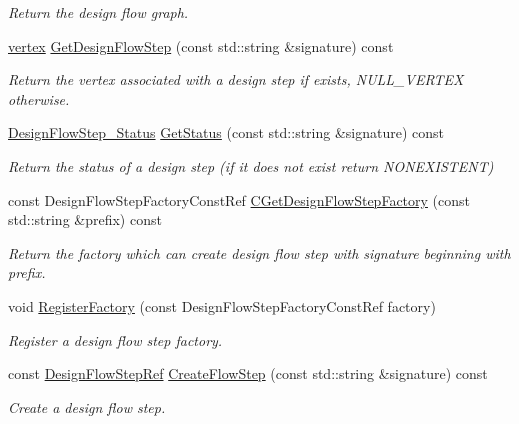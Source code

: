 \begin{DoxyCompactItemize}
\begin{DoxyCompactList}\small\item\em Return the design flow graph. \end{DoxyCompactList}\item 
\hyperlink{graph_8hpp_abefdcf0544e601805af44eca032cca14}{vertex} \hyperlink{classDesignFlowManager_aac97bf59eaa0aaad7c5b4e2b31d7fb55}{Get\+Design\+Flow\+Step} (const std\+::string \&signature) const
\begin{DoxyCompactList}\small\item\em Return the vertex associated with a design step if exists, N\+U\+L\+L\+\_\+\+V\+E\+R\+T\+EX otherwise. \end{DoxyCompactList}\item 
\hyperlink{design__flow__step_8hpp_afb1f0d73069c26076b8d31dbc8ebecdf}{Design\+Flow\+Step\+\_\+\+Status} \hyperlink{classDesignFlowManager_af692644b14a5f889d8511f41aa1317b4}{Get\+Status} (const std\+::string \&signature) const
\begin{DoxyCompactList}\small\item\em Return the status of a design step (if it does not exist return N\+O\+N\+E\+X\+I\+S\+T\+E\+NT) \end{DoxyCompactList}\item 
const Design\+Flow\+Step\+Factory\+Const\+Ref \hyperlink{classDesignFlowManager_af6188161209a658023cd0c26dae9d4ca}{C\+Get\+Design\+Flow\+Step\+Factory} (const std\+::string \&prefix) const
\begin{DoxyCompactList}\small\item\em Return the factory which can create design flow step with signature beginning with prefix. \end{DoxyCompactList}\item 
void \hyperlink{classDesignFlowManager_a863161302c892a561919d294e8d20e0d}{Register\+Factory} (const Design\+Flow\+Step\+Factory\+Const\+Ref factory)
\begin{DoxyCompactList}\small\item\em Register a design flow step factory. \end{DoxyCompactList}\item 
const \hyperlink{design__flow__step_8hpp_a9dd6b4474ddf52d41a78b1aaa12ae6c8}{Design\+Flow\+Step\+Ref} \hyperlink{classDesignFlowManager_a163f98e734cb159907e23c3f6f9abda9}{Create\+Flow\+Step} (const std\+::string \&signature) const
\begin{DoxyCompactList}\small\item\em Create a design flow step. \end{DoxyCompactList}\end{DoxyCompactItemize}
